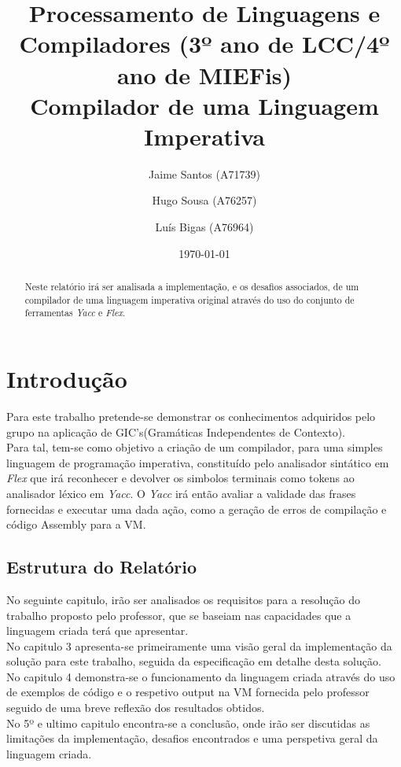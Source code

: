 \documentclass{report}
\title{Processamento de Linguagens e Compiladores (3º ano de LCC/4º ano de MIEFis)\\ \textbf{Compilador de uma Linguagem Imperativa}}
\author{Jaime Santos (A71739) \and Hugo Sousa (A76257) \and Luís Bigas (A76964) }
\date{\today}
\begin{document}
\maketitle

\begin{abstract}
Neste relatório irá ser analisada a implementação, e os desafios associados, de um compilador de uma linguagem imperativa original através do uso do conjunto de ferramentas \textit{Yacc} e \textit{Flex}. \\
\end{abstract}

\tableofcontents

\chapter{Introdução}
Para este trabalho pretende-se demonstrar os conhecimentos adquiridos pelo grupo na aplicação de GIC's(Gramáticas Independentes de Contexto).\\
Para tal, tem-se como objetivo a criação de um compilador, para uma simples linguagem de programação imperativa, constituído pelo analisador sintático em \textit{Flex} que irá reconhecer e devolver os simbolos terminais como tokens ao analisador léxico em \textit{Yacc}. O \textit{Yacc} irá então avaliar a validade das frases fornecidas e executar uma dada ação, como a geração de erros de compilação e código Assembly para a VM.
\section{Estrutura do Relatório} 
No seguinte capitulo, irão ser analisados os requisitos para a resolução do trabalho proposto pelo professor, que se baseiam nas capacidades que a linguagem criada terá que apresentar.\\
No capitulo 3 apresenta-se primeiramente uma visão geral da implementação da solução para este trabalho, seguida da especificação em detalhe desta solução.\\
No capitulo 4 demonstra-se o funcionamento da linguagem criada através do uso de exemplos de código e o respetivo output na VM fornecida pelo professor seguido de uma breve reflexão dos resultados obtidos.\\
No 5º e ultimo capitulo encontra-se a conclusão, onde irão ser discutidas as limitações da implementação, desafios encontrados e uma perspetiva geral da linguagem criada. \\
\end{document}
